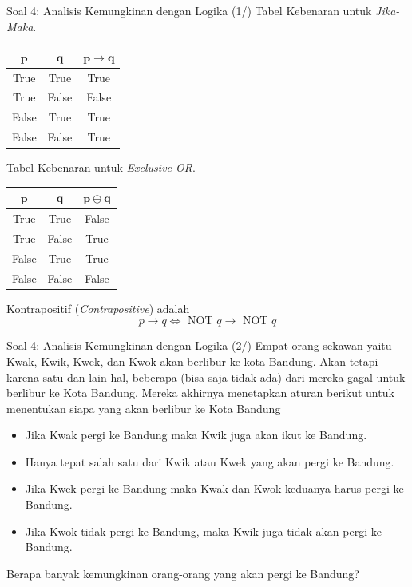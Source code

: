 \documentclass[english,t]{beamer}
\begin{document}
\begin{frame}{Soal 4: Analisis Kemungkinan dengan Logika (1/)}
Tabel Kebenaran untuk \textit{Jika-Maka}.

\begin{table}[!ht]
\centering
\begin{tabular}{|c|c|c|}
\hline
$\bm{p}$ & $\bm{q}$ & $\bm{p \longrightarrow q}$ \\
\hline
True  & True & True \\
\hline
True  & False & False \\
\hline
False & True & True \\
\hline
False & False & True \\
\hline
\end{tabular}
\end{table}

Tabel Kebenaran untuk \textit{Exclusive-OR}.

\begin{table}[!ht]
\centering
\begin{tabular}{|c|c|c|}
\hline
$\bm{p}$ & $\bm{q}$ & $\bm{p \oplus q}$ \\
\hline
True  & True & False \\
\hline
True  & False & True \\
\hline
False & True & True \\
\hline
False & False & False \\
\hline
\end{tabular}
\end{table}

Kontrapositif (\textit{Contrapositive}) adalah
\begin{equation*}
p \longrightarrow q \Longleftrightarrow \text{ NOT }q \longrightarrow \text{ NOT }q
\end{equation*}
\end{frame}

\begin{frame}{Soal 4: Analisis Kemungkinan dengan Logika (2/)}
Empat orang sekawan yaitu Kwak, Kwik, Kwek, dan Kwok akan berlibur ke kota Bandung. Akan tetapi karena satu dan lain hal, beberapa (bisa saja tidak ada) dari mereka gagal untuk berlibur ke Kota Bandung. Mereka akhirnya menetapkan aturan berikut untuk menentukan siapa yang akan berlibur ke Kota Bandung

\begin{itemize}
	\item Jika Kwak pergi ke Bandung maka Kwik juga akan ikut ke Bandung.
	\item Hanya tepat salah satu dari Kwik atau Kwek yang akan pergi ke Bandung.
	\item Jika Kwek pergi ke Bandung maka Kwak dan Kwok keduanya harus pergi ke Bandung.
	\item Jika Kwok tidak pergi ke Bandung, maka Kwik juga tidak akan pergi ke Bandung.
\end{itemize}

Berapa banyak kemungkinan orang-orang yang akan pergi ke Bandung?
\end{frame}
\end{document}
